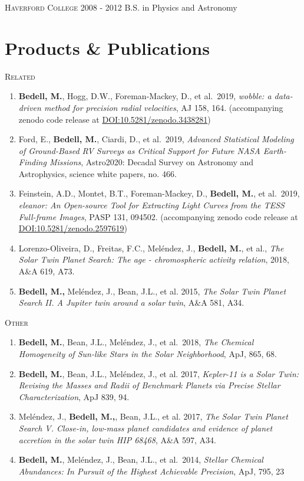\documentclass[letter,12pt]{article} %
\begin{document}
\textsc{Haverford College}  \hfill 2008 - 2012
\newline B.S. in Physics and Astronomy 

\section{Products \& Publications}

\textsc{Related}
\begin{enumerate}
\item \textbf{Bedell, M.}, Hogg, D.W., Foreman-Mackey, D., et al.\ 2019, \textit{wobble: a data-driven method for precision radial velocities}, AJ 158, 164. 
(accompanying zenodo code release at \href{https://doi.org/10.5281/zenodo.3438281}{DOI:10.5281/zenodo.3438281})

\item Ford, E., \textbf{Bedell, M.}, Ciardi, D., et al.\ 2019, \textit{Advanced Statistical Modeling of Ground-Based RV Surveys as Critical Support for Future NASA Earth-Finding Missions}, Astro2020: Decadal Survey on Astronomy and Astrophysics, science white papers, no. 466.

\item Feinstein, A.D., Montet, B.T., Foreman-Mackey, D., \textbf{Bedell, M.}, et al.\ 2019, \textit{eleanor: An Open-source Tool for Extracting Light Curves from the TESS Full-frame Images}, PASP 131, 094502. 
(accompanying zenodo code release at \href{https://doi.org/10.5281/zenodo.2597619}{DOI:10.5281/zenodo.2597619})

\item Lorenzo-Oliveira, D., Freitas, F.C., Mel{\'e}ndez, J., \textbf{Bedell, M.}, et al., \textit{The Solar Twin Planet Search: The age - chromospheric activity relation}, 2018, A\&A 619, A73.

\item \textbf{Bedell, M.,} Mel\'{e}ndez, J., Bean, J.L., et al. 2015, \textit{The Solar Twin Planet Search II. A Jupiter twin around a solar twin}, A\&A 581, A34.
\end{enumerate}

\textsc{Other}
\begin{enumerate}
\item \textbf{Bedell, M.}, Bean, J.L., Mel{\'e}ndez, J., et al.\ 2018, \textit{The Chemical Homogeneity of Sun-like Stars in the Solar Neighborhood}, ApJ, 865, 68.

\item \textbf{Bedell, M.}, Bean, J.L., Mel\'{e}ndez, J., et al. 2017, \textit{Kepler-11 is a Solar Twin: Revising the Masses and Radii of Benchmark Planets via Precise Stellar Characterization}, ApJ 839, 94.

\item Mel{\'e}ndez, J., \textbf{Bedell, M.,}, Bean, J.L., et al. 2017, \textit{The Solar Twin Planet Search V. Close-in, low-mass planet candidates and evidence of planet accretion in the solar twin HIP 68468}, A\&A 597, A34.

\item \textbf{Bedell, M.}, Mel{\'e}ndez, J., Bean, J.L., et al.\ 2014, \textit{Stellar Chemical Abundances: In Pursuit of the Highest Achievable Precision}, ApJ, 795, 23
\end{enumerate}
\end{document}
